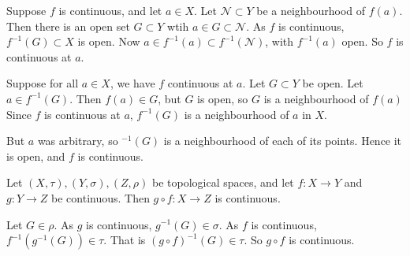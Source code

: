 \documentclass[12pt]{article}
\begin{document}
\begin{proofbox}
	Suppose $f$ is continuous, and let $a \in X$. Let $\mathcal{N} \subset Y$ be a neighbourhood of $f(a)$. Then there is an open set $G \subset Y$ wtih $a \in G \subset \mathcal{N}$. As $f$ is continuous, $f^{-1}(G) \subset X$ is open. Now $a \in f^{-1}(a) \subset f^{-1}(\mathcal{N})$, with $f^{-1}(a)$ open. So $f$ is continuous at $a$.

	Suppose for all $a \in X$, we have $f$ continuous at $a$. Let $G \subset Y$ be open. Let $a \in f^{-1}(G)$. Then $f(a) \in G$, but $G$ is open, so $G$ is a neighbourhood of $f(a)$ Since $f$ is continuous at $a$, $f^{-1}(G)$ is a neighbourhood of $a$ in $X$.

	But $a$ was arbitrary, so $^{-1}(G)$ is a neighbourhood of each of its points. Hence it is open, and $f$ is continuous.
\end{proofbox}

\begin{proposition}
	Let $(X, \tau), (Y, \sigma), (Z, \rho)$ be topological spaces, and let $f : X \to Y$ and $g : Y \to Z$ be continuous. Then $g \circ f : X \to Z$ is continuous.
\end{proposition}

\begin{proofbox}
	Let $G \in \rho$. As $g$ is continuous, $g^{-1}(G) \in \sigma$. As $f$ is continuous, $f^{-1}(g^{-1}(G)) \in \tau$. That is $(g \circ f)^{-1}(G) \in \tau$. So $g \circ f$ is continuous.
\end{proofbox}
\end{document}
